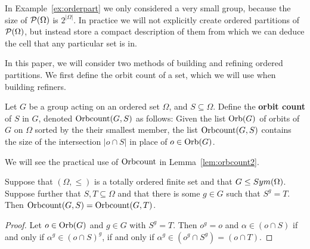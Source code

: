 In Example~\ref{ex:orderpart} we only considered a very small group, because
the size of \(\mathcal{P}(\Omega)\) is \(2^{|\Omega|}\). In practice we will not explicitly
create ordered partitions of \(\mathcal{P}(\Omega)\), but instead store a compact
description of them from which we can deduce the cell that any particular set is in.

In this paper, we will consider two methods of building and refining ordered partitions. We first
define the orbit count of a set, which we will use when building refiners.

\begin{defi}\label{def:orbcount}
  Let \(G\) be a group acting on an ordered set \(\Omega\), and
  \(S \subseteq \Omega\).
  Define the \textbf{orbit count} of \(S\) in \(G\), denoted \(\operatorname{Orbcount}(G,S)\)
  as follows: Given the list \(\operatorname{Orb}(G)\) of orbits of $G$ on $\Omega$ sorted
  by the their smallest member, the list
  $\operatorname{Orbcount}(G,S)$ contains the size of the intersection \(|o \cap S|\) in place
  of $o \in \operatorname{Orb}(G)$.
\end{defi}

We will see the practical use of \(\operatorname{Orbcount}\) in Lemma~\ref{lem:orbcount2}.

\begin{lem}\label{lem:orbcount}
  Suppose that $(\Omega, \le)$ is a totally ordered finite set and that
  $G \le Sym(\Omega)$. Suppose further that \(S,T \subseteq \Omega\) and that there is some $g \in G$ such that $S^g = T$. Then \(\operatorname{Orbcount}(G,S) = \operatorname{Orbcount}(G,T)\).
\end{lem}

\begin{proof}
  Let $o \in \operatorname{Orb}(G)$ and $g \in G$ with $S^g = T$. Then $o^g = o$ and
  $\alpha \in (o \cap S)$ if and only if $\alpha^g \in (o \cap S)^g$,
  if and only if $\alpha^g \in (o^g \cap S^g) = (o \cap T)$.

\end{proof}

